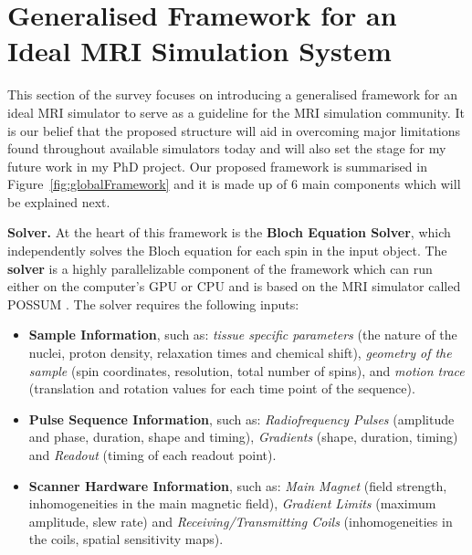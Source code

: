 \section{Generalised Framework for an Ideal MRI Simulation System}
\label{chapterlabel4sec3}

This section of the survey focuses on introducing a generalised framework for an ideal MRI simulator to serve as a guideline for the MRI simulation community.
It is our belief that the proposed structure will aid in overcoming major limitations found throughout available simulators today and will also set the stage for my future work in my PhD project.
Our proposed framework is summarised in Figure~\ref{fig:globalFramework} and it is made up of 6 main components which will be explained next.

\hfill

\textbf{Solver.} At the heart of this framework is the \textbf{Bloch Equation Solver}, which independently solves the Bloch equation for each spin in the input object.
The \textbf{solver} is a highly parallelizable component of the framework which can run either on the computer's GPU or CPU and is based on the MRI simulator called POSSUM \cite{Drobnjak2006}.
The solver requires the following inputs:

\begin{itemize}
    \item \textbf{Sample Information}, such as:
    \textit{tissue specific parameters} (the nature of the nuclei, proton density, relaxation times and chemical shift), 
    \textit{geometry of the sample} (spin coordinates, resolution, total number of spins), and 
    \textit{motion trace} (translation and rotation values for each time point of the sequence).
    
    \item \textbf{Pulse Sequence Information}, such as:
    \textit{Radiofrequency Pulses} (amplitude and phase, duration, shape and timing), 
    \textit{Gradients} (shape, duration, timing) and
    \textit{Readout} (timing of each readout point).
    
    \item \textbf{Scanner Hardware Information}, such as:
    \textit{Main Magnet} (field strength, inhomogeneities in the main magnetic field),
    \textit{Gradient Limits} (maximum amplitude, slew rate) and
    \textit{Receiving/Transmitting Coils} (inhomogeneities in the coils, spatial sensitivity maps). 
\end{itemize}

